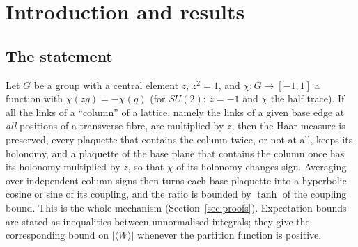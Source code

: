 \documentclass[11pt,a4paper]{article}
\theoremstyle{plain}
\theoremstyle{definition}
\theoremstyle{remark}
\numberwithin{equation}{section}
\begin{document}
\begin{abstract}
\medskip\noindent\emph{Version 1.1 (12 November 2026): literature corrections only; no statement, proof, constant or Lean file is changed.} A literature search made after the publication of version~1.0 found the classical neighbours of these statements. The twist ratio $Z_1/Z_0$ is the quantity of 't~Hooft, with $f=\exp(-F_{\mathrm{el}})=\frac12(1-Z_1/Z_0)$ (notation of Kov\'acs and Tomboulis; $\exp(-F^{\mathrm{el}}/T)$ in that of Tomboulis and Yaffe), and $(Z_0-Z_1)/(Z_0+Z_1)=f/(1-f)$. The centre flip is in Appendix~I.C (p.~332) of Tomboulis and Yaffe and in eq.~(8) of Kovács and Tomboulis. Composed with the classical flux inequality of Tomboulis--Yaffe, Kovács--Tomboulis and Kanazawa, Theorem~\ref{thm:bridge} gives $|\langle W[C]\rangle|\le2\tanh(\beta l^2)^{|A_C|}$ on the periodic lattice of period $l$, for the loops to which that inequality applies; this is a consequence of the cited statements as read, not formalised (Section~\ref{sec:anteriority}).
\end{abstract}

\section{Introduction and results}\label{sec:intro}
\subsection{The statement}
Let $G$ be a group with a central element $z$, $z^2=1$, and $\chi:G\to[-1,1]$ a function with $\chi(zg)=-\chi(g)$ (for $SU(2)$: $z=-1$ and $\chi$ the half trace). If all the links of a ``column'' of a lattice, namely the links of a given base edge at \emph{all} positions of a transverse fibre, are multiplied by $z$, then the Haar measure is preserved, every plaquette that contains the column twice, or not at all, keeps its holonomy, and a plaquette of the base plane that contains the column once has its holonomy multiplied by $z$, so that $\chi$ of its holonomy changes sign. Averaging over independent column signs then turns each base plaquette into a hyperbolic cosine or sine of its coupling, and the ratio is bounded by $\tanh$ of the coupling bound. This is the whole mechanism (Section~\ref{sec:proofs}). Expectation bounds are stated as inequalities between unnormalised integrals; they give the corresponding bound on $|\langle W\rangle|$ whenever the partition function is positive.
\end{document}
